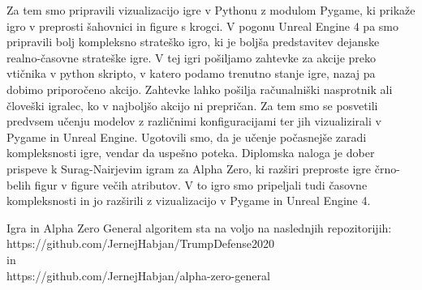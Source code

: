 \documentclass[a4paper, 12pt]{book}
\begin{document}
Za tem smo pripravili vizualizacijo igre v Pythonu z modulom Pygame, ki prikaže igro v preprosti šahovnici in figure s krogci.
V pogonu Unreal Engine 4 pa smo pripravili bolj kompleksno strateško igro, ki je boljša predstavitev dejanske realno-časovne strateške igre.
V tej igri pošiljamo zahtevke za akcije preko vtičnika v python skripto, v katero podamo trenutno stanje igre, nazaj pa dobimo priporočeno akcijo.
Zahtevke lahko pošilja r\textsl{}ačunalniški nasprotnik ali človeški igralec, ko v najboljšo akcijo ni prepričan.
Za tem smo se posvetili predvsem učenju modelov z različnimi konfiguracijami ter jih vizualizirali v Pygame in Unreal Engine.
Ugotovili smo, da je učenje počasnejše zaradi kompleksnosti igre, vendar da uspešno poteka.
Diplomska naloga je dober prispeve k Surag-Nairjevim igram za Alpha Zero, ki razširi preproste igre črno-belih figur v figure večih atributov.
V to igro smo pripeljali tudi časovne kompleksnosti in jo razširili z vizualizacijo v Pygame in Unreal Engine 4.

Igra in Alpha Zero General algoritem sta na voljo na naslednjih repozitorijih:\\
https://github.com/JernejHabjan/TrumpDefense2020\\
in \\ 
https://github.com/JernejHabjan/alpha-zero-general

\newpage %
\ \\
\clearpage
{}


\end{document}
